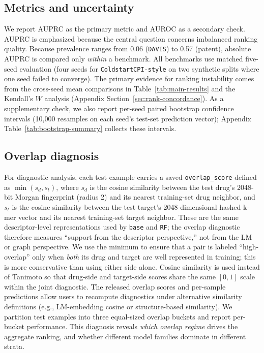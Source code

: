 \documentclass[referee,pdflatex,sn-basic,Numbered]{sn-jnl}
\newcommand{\AUPRC}{AUPRC}
\newcommand{\AUROC}{AUROC}
\begin{document}
\subsection{Metrics and uncertainty}

We report \AUPRC{} as the primary metric and \AUROC{} as a secondary check. \AUPRC{} is emphasized because the central question concerns imbalanced ranking quality. Because prevalence ranges from 0.06 (\texttt{DAVIS}) to 0.57 (patent), absolute \AUPRC{} is compared only \emph{within} a benchmark. All benchmarks use matched five-seed evaluation (four seeds for \texttt{ColdstartCPI-style} on two synthetic splits where one seed failed to converge). The primary evidence for ranking instability comes from the cross-seed mean comparisons in Table~\ref{tab:main-results} and the Kendall's $W$ analysis (Appendix Section~\ref{sec:rank-concordance}). As a supplementary check, we also report per-seed paired bootstrap confidence intervals (10,000 resamples on each seed's test-set prediction vector); Appendix Table~\ref{tab:bootstrap-summary} collects these intervals.

\subsection{Overlap diagnosis}

For diagnostic analysis, each test example carries a saved \texttt{overlap\_score} defined as $\min(s_d, s_t)$, where $s_d$ is the cosine similarity between the test drug's 2048-bit Morgan fingerprint (radius 2) and its nearest training-set drug neighbor, and $s_t$ is the cosine similarity between the test target's 2048-dimensional hashed k-mer vector and its nearest training-set target neighbor. These are the same descriptor-level representations used by \texttt{base} and \texttt{RF}; the overlap diagnostic therefore measures ``support from the descriptor perspective,'' not from the LM or graph perspective. We use the minimum to ensure that a pair is labeled ``high-overlap'' only when \emph{both} its drug and target are well represented in training; this is more conservative than using either side alone. Cosine similarity is used instead of Tanimoto so that drug-side and target-side scores share the same $[0,1]$ scale within the joint diagnostic. The released overlap scores and per-sample predictions allow users to recompute diagnostics under alternative similarity definitions (e.g., LM-embedding cosine or structure-based similarity). We partition test examples into three equal-sized overlap buckets and report per-bucket performance. This diagnosis reveals \emph{which overlap regime} drives the aggregate ranking, and whether different model families dominate in different strata.
\end{document}
